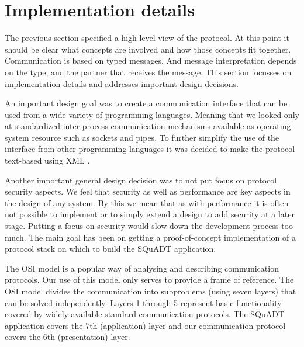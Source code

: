 \documentclass{article}
\newcommand{\squadt}{SQuADT\xspace}
\begin{document}
 \section{Implementation details} \label{s:protocol_implementation}

   The previous section specified a high level view of the protocol. At this
   point it should be clear what concepts are involved and how those concepts
   fit together. Communication is based on typed messages. And message
   interpretation depends on the type, and the partner that receives the
   message. This section focusses on implementation details and addresses
   important design decisions.
   
   An important design goal was to create a communication interface that can be
   used from a wide variety of programming languages. Meaning that we looked
   only at standardized inter-process communication mechanisms available as
   operating system resource such as sockets and pipes. To further simplify
   the use of the interface from other programming languages it was decided
   to make the protocol text-based using XML \cite{XML-1_0-4}.

   Another important general design decision was to not put focus on protocol
   security aspects. We feel that security as well as performance are key
   aspects in the design of any system. By this we mean that as with
   performance it is often not possible to implement or to simply extend a
   design to add security at a later stage. Putting a focus on security would
   slow down the development process too much. The main goal has been on
   getting a proof-of-concept implementation of a protocol stack on which to
   build the \squadt application.

   The OSI model \cite{Day1983} is a popular way of analysing and describing
   communication protocols. Our use of this model only serves to provide a
   frame of reference. The OSI model divides the communication into subproblems
   (using seven layers) that can be solved independently. Layers 1 through 5
   represent basic functionality covered by widely available standard
   communication protocols. The \squadt application covers the 7th
   (application) layer and our communication protocol covers the 6th
   (presentation) layer.
   
\end{document}
